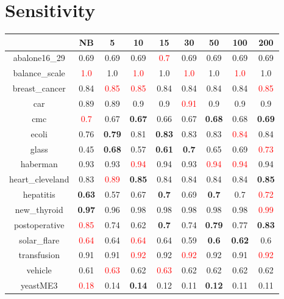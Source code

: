 \documentclass{article}%
\begin{document}
\section*{Sensitivity}%
\begin{tabular}{c|cccccccc}%
\hline%
&NB&5&10&15&30&50&100&200\\%
\hline%
abalone16\_29&0.69&0.69&0.69&\textcolor{red}{ 
0.7
}&0.69&0.69&0.69&0.69\\%
\hline%
balance\_scale&\textcolor{red}{ 
1.0
}&1.0&\textcolor{red}{ 
1.0
}&1.0&\textcolor{red}{ 
1.0
}&1.0&\textcolor{red}{ 
1.0
}&1.0\\%
\hline%
breast\_cancer&0.84&\textcolor{red}{ 
0.85
}&\textcolor{red}{ 
0.85
}&0.84&0.84&0.84&0.84&\textcolor{red}{ 
0.85
}\\%
\hline%
car&0.89&0.89&0.9&0.9&\textcolor{red}{ 
0.91
}&0.9&0.9&0.9\\%
\hline%
cmc&\textcolor{red}{ 
0.7
}&0.67&\textbf{0.67}&0.66&0.67&\textbf{0.68}&0.68&\textbf{0.69}\\%
\hline%
ecoli&0.76&\textbf{0.79}&0.81&\textbf{0.83}&0.83&0.83&\textcolor{red}{ 
0.84
}&0.84\\%
\hline%
glass&0.45&\textbf{0.68}&0.57&\textbf{0.61}&\textbf{0.7}&0.65&0.69&\textcolor{red}{ 
0.73
}\\%
\hline%
haberman&0.93&0.93&\textcolor{red}{ 
0.94
}&0.94&0.93&\textcolor{red}{ 
0.94
}&\textcolor{red}{ 
0.94
}&0.94\\%
\hline%
heart\_cleveland&0.83&\textcolor{red}{ 
0.89
}&\textbf{0.85}&0.84&0.84&0.84&0.84&\textbf{0.85}\\%
\hline%
hepatitis&\textbf{0.63}&0.57&0.67&\textbf{0.7}&0.69&\textbf{0.7}&0.7&\textcolor{red}{ 
0.72
}\\%
\hline%
new\_thyroid&\textbf{0.97}&0.96&0.98&0.98&0.98&0.98&0.98&\textcolor{red}{ 
0.99
}\\%
\hline%
postoperative&\textcolor{red}{ 
0.85
}&0.74&0.62&\textbf{0.7}&0.74&\textbf{0.79}&0.77&\textbf{0.83}\\%
\hline%
solar\_flare&\textcolor{red}{ 
0.64
}&0.64&\textcolor{red}{ 
0.64
}&0.64&0.59&\textbf{0.6}&\textbf{0.62}&0.6\\%
\hline%
transfusion&0.91&0.91&\textcolor{red}{ 
0.92
}&0.92&\textcolor{red}{ 
0.92
}&0.92&0.91&\textcolor{red}{ 
0.92
}\\%
\hline%
vehicle&0.61&\textcolor{red}{ 
0.63
}&0.62&\textcolor{red}{ 
0.63
}&0.62&0.62&0.62&0.62\\%
\hline%
yeastME3&\textcolor{red}{ 
0.18
}&0.14&\textbf{0.14}&0.12&0.11&\textbf{0.12}&0.11&0.11\\%

\end{tabular}
\end{document}
